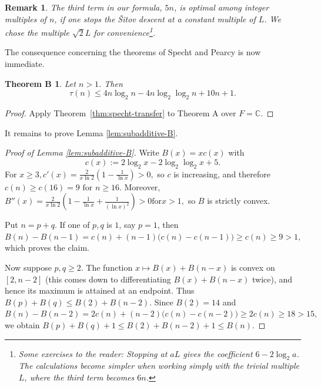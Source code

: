 \documentclass[11pt]{article}
\renewcommand{\geq}{\geqslant}
\renewcommand{\leq}{\leqslant}
\newcommand{\C}{\mathbb{C}}
\newtheorem{auxiliary proposition}[theorem]{Auxiliary Proposition}
\newtheorem{main conjecture}[theorem]{Main Conjecture}
\newtheorem{main theorem}[theorem]{Main Theorem}
\newtheorem{modesty proposition}[theorem]{Modesty Proposition}
\newtheorem{open problem}[theorem]{Open Problem}
\newtheorem{remark}[theorem]{Remark}
\newtheorem{convergence lemma}[theorem]{Convergence Lemma}
\newtheorem{corrected lemma}[theorem]{Corrected Lemma}
\newtheorem{growth lemma}[theorem]{Growth Lemma}
\newtheorem{coefficient lemma}[theorem]{Integrality Lemma}
\newtheorem{interpolation lemma}[theorem]{Interpolation Lemma}
\newtheorem{kernel lemma}[theorem]{Kernel Lemma}
\newtheorem{limit lemma}[theorem]{Limit Lemma}
\newtheorem{tandem lemma}[theorem]{Modesty Lemma}
\newtheorem{zero-finding lemma}[theorem]{Zero-Finding Lemma}
\newtheorem*{theoremB}{Theorem B}
\numberwithin{equation}{section}
\begin{document}
\begin{remark}
	The third term in our formula, $5n$, is optimal among integer multiples of $n$, if one stops the \v{S}itov descent at a constant multiple of $L$. We chose the multiple $\sqrt{2}L$ for convenience\footnote{Some exercises to the reader: Stopping at $aL$ gives the
coefficient $ 6-2\log_2 a$. The calculations become simpler when working simply with the trivial multiple $L$, where the third term becomes $6n$. %
}.
\end{remark}


The consequence concerning the theorems of Specht and Pearcy is now immediate.

\begin{theoremB}
Let $n>1$.  Then
$$\tau(n)\leq4n\log_2 n-4n\log_2\log_2 n+10n+1.$$

\end{theoremB}


\begin{proof}
Apply Theorem~\ref{thm:specht-transfer} to Theorem A over $F=\C$.

\end{proof}

It remains to prove Lemma \ref{lem:subadditive-B}.

\begin{proof}[Proof of Lemma \ref{lem:subadditive-B}]
Write
$B(x)=x c(x)$ with
$$c(x):=2\log_2x-2\log_2\log_2x+5.$$
For $x\geq3,c'(x)=\frac{2}{x\ln2}\left(1-\frac1{\ln x}\right)>0,$ so $c$ is increasing, and therefore $c(n)\geq c(16)=9\text{ for }n\geq16.$
Moreover, $B''(x)=\frac{2}{x\ln2}\left(1-\frac1{\ln x}+\frac1{(\ln x)^2}\right)>0\text{for}x>1,$ so $B$ is strictly convex.

Put $n=p+q$.  If one of $p,q$ is $1$, say $p=1$, then $B(n)-B(n-1)=c(n)+(n-1)\bigl(c(n)-c(n-1)\bigr)\geq c(n)\geq9>1,$ which proves the claim.

Now suppose $p,q\geq2$.  The function $x\mapsto B(x)+B(n-x)$ is convex on $[2,n-2]$ (this comes down to differentiating $B(x)+B(n-x)$ twice), and hence its maximum is attained at an
endpoint.  Thus $B(p)+B(q)\leq B(2)+B(n-2).$
Since $B(2)=14$ and $B(n)-B(n-2)=2c(n)+(n-2)\bigl(c(n)-c(n-2)\bigr)\geq2c(n)\geq18>15,$ we obtain $B(p)+B(q)+1\leq B(2)+B(n-2)+1\leq B(n).$

\end{proof}
\end{document}
